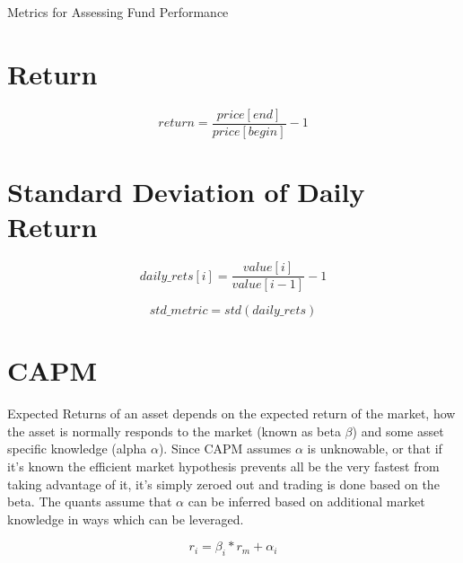 \documentclass{article}
\begin{document}
    \centerline{\Large Metrics for Assessing Fund Performance}
    \section{Return}
    \begin{equation}
    return = \frac{price[end] }{price[begin]}- 1
    \end{equation}
    \section{Standard Deviation of Daily Return}
    
    \begin{equation}
        daily\_rets[i] = \frac{value[i]}{value[i-1]} -1 
    \end{equation} 
    
    \begin{equation}
        std\_metric = std(daily\_rets)
    \end{equation}
    \section{CAPM}
    Expected Returns of an asset depends on the expected return of the market, how the asset is normally responds to the market (known as beta $\beta$) and some asset specific knowledge (alpha $\alpha$).  Since CAPM assumes $\alpha$ is unknowable, or that if it's known the efficient market hypothesis prevents all be the very fastest from taking advantage of it, it's simply zeroed out and trading is done based on the beta.  The quants assume that $\alpha$ can be inferred based on additional market knowledge in ways which can be leveraged.

    $$r_i=\beta_i*r_m+\alpha_i$$
\end{document}
